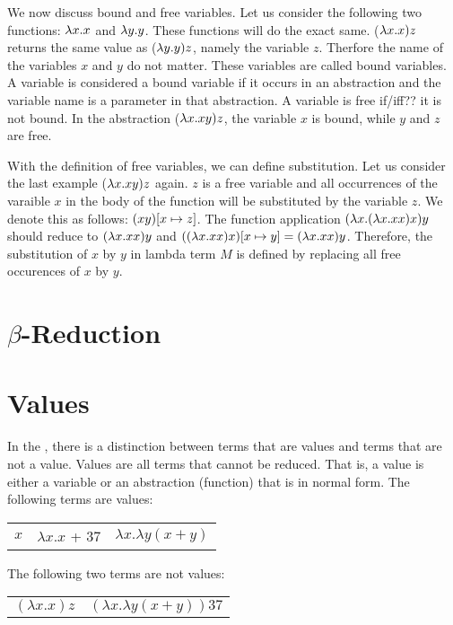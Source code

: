 We now discuss bound and free variables. Let us consider the following two functions: $\lambda x. x$ and $\lambda y. y$. These functions will do the exact same.
($\lambda x. x) z$ returns the same value as ($\lambda y.y) z$, namely the variable $z$. Therfore the name of the variables $x$ and $y$ do not matter. These variables are called bound variables.
A variable is considered a bound variable if it occurs in an abstraction and the variable name is a parameter in that abstraction. A variable is free if/iff?? it is not bound.
In the abstraction ($\lambda x. xy) z$, the variable $x$ is bound, while $y$ and $z$ are free.

With the definition of free variables, we can define substitution. Let us consider the last example ($\lambda x. xy) z$ again. $z$ is a free variable and all occurrences of the varaible $x$ in the body of the function will be substituted by the variable $z$.
We denote this as follows: $(xy) [{x}\mapsto{z}]$. The function application $(\lambda x. (\lambda x. x x) x)y$ should reduce to $(\lambda x. x x) y$ and $((\lambda x. x x) x) [{x}\mapsto{y}] = (\lambda x. x x) y$.
Therefore, the substitution of $x$ by $y$ in lambda term $M$ is defined by replacing all free occurences of $x$ by $y$.

\section{\texorpdfstring{\boldmath${\beta}$-Reduction}{Beta Reduction}}

\section{Values}
In the \lc, there is a distinction between terms that are values and terms that are not a value.
Values are all terms that cannot be reduced. That is, a value is either a variable or an abstraction (function) that is in normal form.
The following terms are values:

\vspace{10pt}
\begin{tabular}{c c c}
	$x$ & \quad $\lambda x. x$ + 37 & \quad $\lambda x.\lambda y (x + y)$
\end{tabular}

\vspace{10pt}
The following two terms are not values:

\vspace{10pt}
\begin{tabular}{c c}
	$(\lambda x. x) z$ & \quad $(\lambda x.\lambda y (x + y))37$
\end{tabular}

